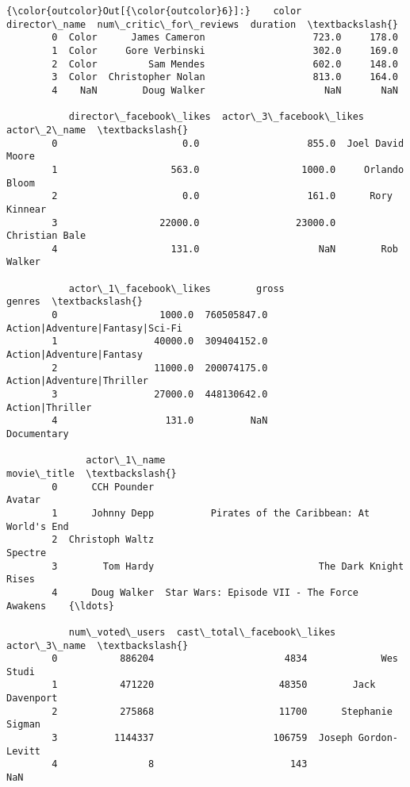 \documentclass[11pt]{article}
\begin{document}
\begin{Verbatim}[commandchars=\\\{\}]
{\color{outcolor}Out[{\color{outcolor}6}]:}    color      director\_name  num\_critic\_for\_reviews  duration  \textbackslash{}
        0  Color      James Cameron                   723.0     178.0   
        1  Color     Gore Verbinski                   302.0     169.0   
        2  Color         Sam Mendes                   602.0     148.0   
        3  Color  Christopher Nolan                   813.0     164.0   
        4    NaN        Doug Walker                     NaN       NaN   
        
           director\_facebook\_likes  actor\_3\_facebook\_likes      actor\_2\_name  \textbackslash{}
        0                      0.0                   855.0  Joel David Moore   
        1                    563.0                  1000.0     Orlando Bloom   
        2                      0.0                   161.0      Rory Kinnear   
        3                  22000.0                 23000.0    Christian Bale   
        4                    131.0                     NaN        Rob Walker   
        
           actor\_1\_facebook\_likes        gross                           genres  \textbackslash{}
        0                  1000.0  760505847.0  Action|Adventure|Fantasy|Sci-Fi   
        1                 40000.0  309404152.0         Action|Adventure|Fantasy   
        2                 11000.0  200074175.0        Action|Adventure|Thriller   
        3                 27000.0  448130642.0                  Action|Thriller   
        4                   131.0          NaN                      Documentary   
        
              actor\_1\_name                                        movie\_title  \textbackslash{}
        0      CCH Pounder                                            Avatar    
        1      Johnny Depp          Pirates of the Caribbean: At World's End    
        2  Christoph Waltz                                           Spectre    
        3        Tom Hardy                             The Dark Knight Rises    
        4      Doug Walker  Star Wars: Episode VII - The Force Awakens    {\ldots}   
        
           num\_voted\_users  cast\_total\_facebook\_likes          actor\_3\_name  \textbackslash{}
        0           886204                       4834             Wes Studi   
        1           471220                      48350        Jack Davenport   
        2           275868                      11700      Stephanie Sigman   
        3          1144337                     106759  Joseph Gordon-Levitt   
        4                8                        143                   NaN   
        

\end{Verbatim}
\end{document}
